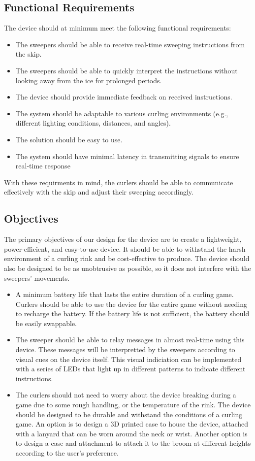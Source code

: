 \documentclass{article}
\begin{document}
\subsection{Functional Requirements}
The device should at minimum meet the following functional requirements:
\begin{itemize}
    \item The sweepers should be able to receive real-time sweeping instructions from the skip.
    \item The sweepers should be able to quickly interpret the instructions without looking away from the ice for prolonged periods.
    \item The device should provide immediate feedback on received instructions.
    \item The system should be adaptable to various curling environments (e.g., different lighting conditions, distances, and angles).
    \item The solution should be easy to use.
    \item The system should have minimal latency in transmitting signals to ensure real-time response
\end{itemize}

With these requirments in mind, the curlers should be able to communicate effectively with the skip and adjust their sweeping accordingly. 

\subsection{Objectives}
The primary objectives of our design for the device are to create a lightweight, power-efficient, and easy-to-use device. It should be able to withstand the harsh environment of a curling rink and be cost-effective to produce. The device should also be designed to be as unobtrusive as possible, so it does not interfere with the sweepers' movements.
\begin{itemize}
    \item A minimum battery life that lasts the entire duration of a curling game. Curlers should be able to use the device for the entire game without needing to recharge the battery. If the battery life is not sufficient, the battery should be easily swappable.
    \item The sweeper should be able to relay messages in almost real-time using this device. These messages will be interpretted by the sweepers according to visual cues on the device itself. This visual indiciation can be implemented with a series of LEDs that light up in different patterns to indicate different instructions.
    \item The curlers should not need to worry about the device breaking during a game due to some rough handling, or the temperature of the rink. The device should be designed to be durable and withstand the conditions of a curling game. An option is to design a 3D printed case to house the device, attached with a lanyard that can be worn around the neck or wrist. Another option is to design a case and attachment to attach it to the broom at different heights according to the user's preference.
\end{itemize}
\end{document}

